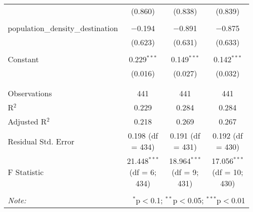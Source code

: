 \begin{table}[!htbp]
\begin{tabular}{@{\extracolsep{5pt}}lccc}
  & (0.860) & (0.838) & (0.839) \\ 
  & & & \\ 
 population\_density\_destination & $-$0.194 & $-$0.891 & $-$0.875 \\ 
  & (0.623) & (0.631) & (0.633) \\ 
  & & & \\ 
 Constant & 0.229$^{***}$ & 0.149$^{***}$ & 0.142$^{***}$ \\ 
  & (0.016) & (0.027) & (0.032) \\ 
  & & & \\ 
\hline \\[-1.8ex] 
Observations & 441 & 441 & 441 \\ 
R$^{2}$ & 0.229 & 0.284 & 0.284 \\ 
Adjusted R$^{2}$ & 0.218 & 0.269 & 0.267 \\ 
Residual Std. Error & 0.198 (df = 434) & 0.191 (df = 431) & 0.192 (df = 430) \\ 
F Statistic & 21.448$^{***}$ (df = 6; 434) & 18.964$^{***}$ (df = 9; 431) & 17.056$^{***}$ (df = 10; 430) \\ 
\hline 
\hline \\[-1.8ex] 
\textit{Note:}  & \multicolumn{3}{r}{$^{*}$p$<$0.1; $^{**}$p$<$0.05; $^{***}$p$<$0.01} \\ 
\end{tabular} 
\end{table} 
